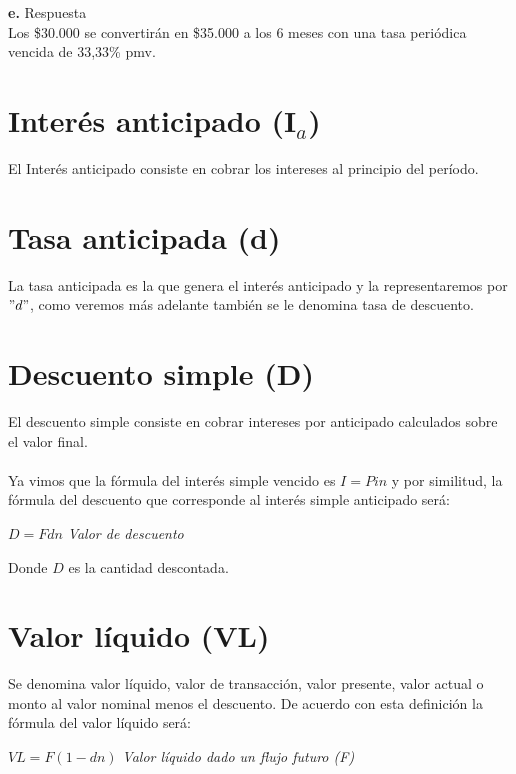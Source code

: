 \textbf{e.} Respuesta \\
Los \$30.000 se convertirán en \$35.000 a los 6 meses con una tasa periódica vencida de 33,33\% pmv. 

\section{Interés anticipado (I$_{a}$)}
El Interés anticipado consiste en cobrar los intereses al principio del período.

\section{Tasa anticipada (d)}
La tasa anticipada es la que genera el interés anticipado y la representaremos por $"d"$, como veremos más adelante también se le denomina tasa de descuento.

\section{Descuento simple (D)}
El descuento simple consiste en cobrar intereses por anticipado calculados sobre el valor final.
\\\\
Ya vimos que la fórmula del interés simple vencido es $I= P i n$ y por similitud, la fórmula del descuento que corresponde al interés simple anticipado será:
\begin{center}
$D=Fdn$ \hspace{35 pt} \textit{Valor de descuento}
\end{center}
Donde $D$ es la cantidad descontada.

\section{Valor líquido (VL)}
Se denomina valor líquido, valor de transacción, valor presente, valor actual o monto al valor nominal menos el descuento. De acuerdo con esta definición la fórmula del valor líquido será:
\begin{center}
$VL=F(1-dn)$ \hspace{35 pt} \textit{Valor líquido dado un flujo futuro (F)}
\end{center}

